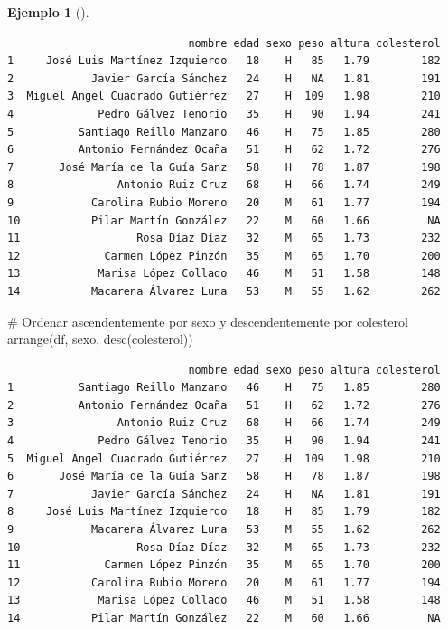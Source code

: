 \documentclass[
  spanish,
  a4paper,
]{scrreport}
\newenvironment{Shaded}{\begin{snugshade}}{\end{snugshade}}
\newcommand{\CommentTok}[1]{\textcolor[rgb]{0.37,0.37,0.37}{#1}}
\newcommand{\FunctionTok}[1]{\textcolor[rgb]{0.28,0.35,0.67}{#1}}
\newcommand{\NormalTok}[1]{\textcolor[rgb]{0.00,0.23,0.31}{#1}}
\theoremstyle{definition}
\theoremstyle{definition}
\newtheorem{example}{Ejemplo}[chapter]
\theoremstyle{remark}
\begin{document}
\begin{example}[]
\begin{verbatim}
                            nombre edad sexo peso altura colesterol
1     José Luis Martínez Izquierdo   18    H   85   1.79        182
2            Javier García Sánchez   24    H   NA   1.81        191
3  Miguel Angel Cuadrado Gutiérrez   27    H  109   1.98        210
4             Pedro Gálvez Tenorio   35    H   90   1.94        241
5          Santiago Reillo Manzano   46    H   75   1.85        280
6          Antonio Fernández Ocaña   51    H   62   1.72        276
7       José María de la Guía Sanz   58    H   78   1.87        198
8                Antonio Ruiz Cruz   68    H   66   1.74        249
9            Carolina Rubio Moreno   20    M   61   1.77        194
10           Pilar Martín González   22    M   60   1.66         NA
11                  Rosa Díaz Díaz   32    M   65   1.73        232
12             Carmen López Pinzón   35    M   65   1.70        200
13            Marisa López Collado   46    M   51   1.58        148
14           Macarena Álvarez Luna   53    M   55   1.62        262
\end{verbatim}

\begin{Shaded}
\begin{Highlighting}[]
\CommentTok{\# Ordenar ascendentemente por sexo y descendentemente por colesterol}
\FunctionTok{arrange}\NormalTok{(df, sexo, }\FunctionTok{desc}\NormalTok{(colesterol))}
\end{Highlighting}
\end{Shaded}

\begin{verbatim}
                            nombre edad sexo peso altura colesterol
1          Santiago Reillo Manzano   46    H   75   1.85        280
2          Antonio Fernández Ocaña   51    H   62   1.72        276
3                Antonio Ruiz Cruz   68    H   66   1.74        249
4             Pedro Gálvez Tenorio   35    H   90   1.94        241
5  Miguel Angel Cuadrado Gutiérrez   27    H  109   1.98        210
6       José María de la Guía Sanz   58    H   78   1.87        198
7            Javier García Sánchez   24    H   NA   1.81        191
8     José Luis Martínez Izquierdo   18    H   85   1.79        182
9            Macarena Álvarez Luna   53    M   55   1.62        262
10                  Rosa Díaz Díaz   32    M   65   1.73        232
11             Carmen López Pinzón   35    M   65   1.70        200
12           Carolina Rubio Moreno   20    M   61   1.77        194
13            Marisa López Collado   46    M   51   1.58        148
14           Pilar Martín González   22    M   60   1.66         NA
\end{verbatim}

\end{example}
\end{document}
